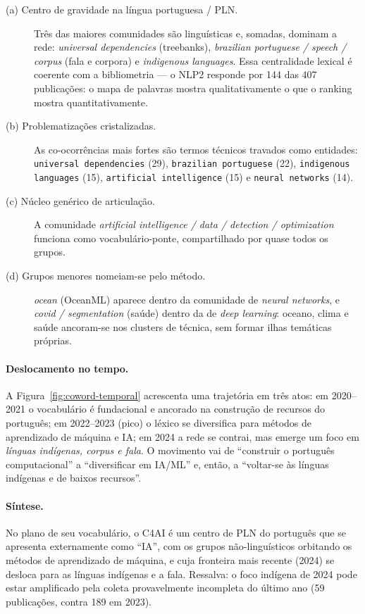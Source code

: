 \documentclass[12pt,a4paper]{article}
\begin{document}
\begin{description}
  \item[(a) Centro de gravidade na língua portuguesa / PLN.] Três das maiores
  comunidades são linguísticas e, somadas, dominam a rede: \emph{universal
  dependencies} (treebanks), \emph{brazilian portuguese / speech / corpus}
  (fala e corpora) e \emph{indigenous languages}. Essa centralidade lexical é
  coerente com a bibliometria --- o NLP2 responde por \num{144} das \num{407}
  publicações: o mapa de palavras mostra qualitativamente o que o ranking
  mostra quantitativamente.
  \item[(b) Problematizações cristalizadas.] As co-ocorrências mais fortes são
  termos técnicos travados como entidades: \texttt{universal dependencies}
  (\num{29}), \texttt{brazilian portuguese} (\num{22}), \texttt{indigenous
  languages} (\num{15}), \texttt{artificial intelligence} (\num{15}) e
  \texttt{neural networks} (\num{14}).
  \item[(c) Núcleo genérico de articulação.] A comunidade \emph{artificial
  intelligence / data / detection / optimization} funciona como
  vocabulário-ponte, compartilhado por quase todos os grupos.
  \item[(d) Grupos menores nomeiam-se pelo método.] \emph{ocean} (OceanML)
  aparece dentro da comunidade de \emph{neural networks}, e \emph{covid /
  segmentation} (saúde) dentro da de \emph{deep learning}: oceano, clima e
  saúde ancoram-se nos clusters de técnica, sem formar ilhas temáticas próprias.
\end{description}

\paragraph{Deslocamento no tempo.} A Figura~\ref{fig:coword-temporal} acrescenta
uma trajetória em três atos: em 2020--2021 o vocabulário é fundacional e
ancorado na construção de recursos do português; em 2022--2023 (pico) o léxico
se diversifica para métodos de aprendizado de máquina e IA; em 2024 a rede se
contrai, mas emerge um foco em \emph{línguas indígenas, corpus e fala}. O
movimento vai de ``construir o português computacional'' a ``diversificar em
IA/ML'' e, então, a ``voltar-se às línguas indígenas e de baixos recursos''.

\paragraph{Síntese.} No plano de seu vocabulário, o C4AI é um centro de PLN do
português que se apresenta externamente como ``IA'', com os grupos
não-linguísticos orbitando os métodos de aprendizado de máquina, e cuja
fronteira mais recente (2024) se desloca para as línguas indígenas e a fala.
Ressalva: o foco indígena de 2024 pode estar amplificado pela coleta
provavelmente incompleta do último ano (\num{59} publicações, contra \num{189}
em 2023).
\end{document}
